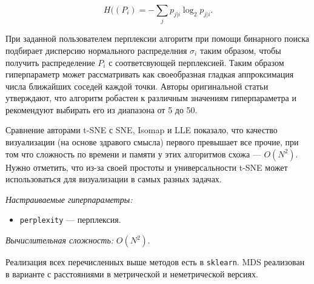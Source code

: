 \documentclass[10pt, a4paper]{extarticle}
\newcommand{\code}[1]{\texttt{#1}}
\begin{document}
\[
H((P_i) = -\sum_jp_{j|i}\log_2p_{j|i}.
\]

При заданной пользователем перплексии алгоритм при помощи бинарного поиска подбирает дисперсию нормального распределния $\sigma_i$ таким образом, чтобы получить распределение $P_i$ с соответсвующей перплексией.
Таким образом гиперпараметр может рассматривать как своеобразная гладкая аппроксимация числа ближайших соседей каждой точки.
Авторы оригинальной статьи утверждают, что алгоритм робастен к различным значениям гиперпараметра и рекомендуют выбирать его из диапазона от 5 до 50.

Сравнение авторами t-SNE с SNE, Isomap и LLE  показало, что качество визуализации (на основе здравого смысла) первого превышает все прочие, при том что сложность по времени и памяти у этих алгоритмов схожа — $O(N^2)$. 
Нужно отметить, что из-за своей простоты и универсальности t-SNE может использоваться для визуализации в самых разных задачах.

\textit{Настраиваемые гиперпараметры:}
\begin{itemize}
    \item \code{perplexity} — перплексия.
\end{itemize}
\textit{Вычислительная сложность:} $O(N^2)$.

Реализация всех перечисленных выше методов есть в \code{sklearn}. 
MDS реализован в варианте с расстояниями в метрической и неметрической версиях.
\end{document}
